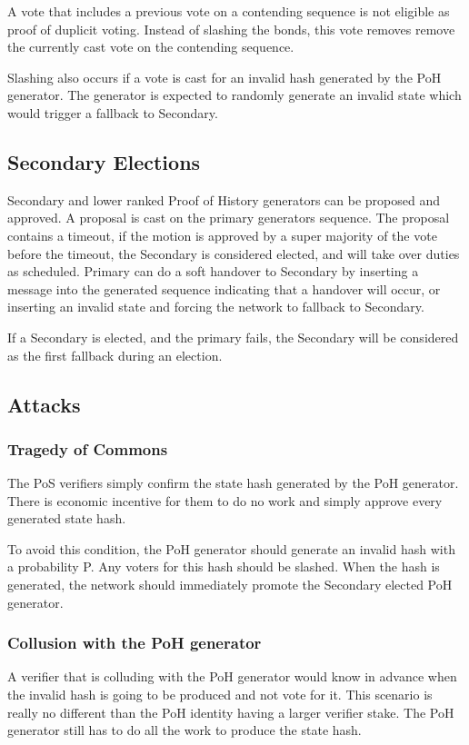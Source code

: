 \documentclass[12pt]{article}
\begin{document}
A vote that includes a previous vote on a contending sequence is not eligible as proof of duplicit voting. Instead of slashing the bonds, this vote removes remove the currently cast vote on the contending sequence.

Slashing also occurs if a vote is cast for an invalid hash generated by the PoH generator. The generator is expected to randomly generate an invalid state which would trigger a fallback to Secondary.
\subsection{Secondary Elections}
Secondary and lower ranked Proof of History generators can be proposed and approved. A proposal is cast on the primary generators sequence. The proposal contains a timeout, if the motion is approved by a super majority of the vote before the timeout, the Secondary is considered elected, and will take over duties as scheduled. Primary can do a soft handover to Secondary by inserting a message into the generated sequence indicating that a handover will occur, or inserting an invalid state and forcing the network to fallback to Secondary.

If a Secondary is elected, and the primary fails, the Secondary will be considered as the first fallback during an election.

\subsection{Attacks}
\subsubsection{Tragedy of Commons}

The PoS verifiers simply confirm the state hash generated by the PoH generator. There is economic incentive for them to do no work and simply approve every generated state hash. 

To avoid this condition, the PoH generator should generate an invalid hash with a probability P. Any voters for this hash should be slashed. When the hash is generated, the network should immediately promote the Secondary elected PoH generator.

\subsubsection{Collusion with the PoH generator}\label{subsubsec:collusion}
A verifier that is colluding with the PoH generator would know in advance when the invalid hash is going to be produced and not vote for it. This scenario is really no different than the PoH identity having a larger verifier stake. The PoH generator still has to do all the work to produce the state hash.
\end{document}
